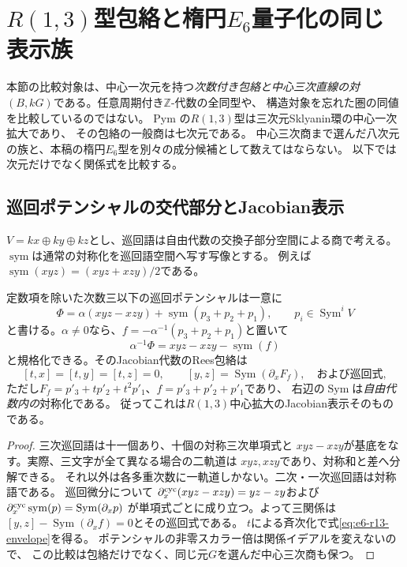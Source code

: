 \section{\texorpdfstring{$R(1,3)$型包絡と楕円$E_6$量子化の同じ表示族}{R(1,3)型包絡と楕円E6量子化の同じ表示族}}
\label{sec:e6-r13-comparison}
本節の比較対象は、中心一次元を持つ\emph{次数付き包絡と中心三次直線の対}
$(B,kG)$である。任意周期付き$\mathbb Z$-代数の全同型や、
構造対象を忘れた圏の同値を比較しているのではない。
Pym \cite[\S3.4, (9)]{PymR13}の$R(1,3)$型は三次元Sklyanin環の中心一次拡大であり、
その包絡の一般商は七次元である。
中心三次商まで選んだ八次元の族と、本稿の楕円$E_6$型を別々の成分候補として数えてはならない。
以下では次元だけでなく関係式を比較する。

\subsection{巡回ポテンシャルの交代部分とJacobian表示}
$V=kx\oplus ky\oplus kz$とし、巡回語は自由代数の交換子部分空間による商で考える。
$\operatorname{sym}$は通常の対称化を巡回語空間へ写す写像とする。
例えば$\operatorname{sym}(xyz)=(xyz+xzy)/2$である。
\begin{lemma}[交代係数が非零の巡回chart]
\label{lem:e6-r13-cyclic-chart}
定数項を除いた次数三以下の巡回ポテンシャルは一意に
\[
 \Phi=\alpha(xyz-xzy)+\operatorname{sym}(p_3+p_2+p_1),
 \qquad p_i\in\operatorname{Sym}^iV
\]
と書ける。$\alpha\ne0$なら、$f=-\alpha^{-1}(p_3+p_2+p_1)$と置いて
\[
 \alpha^{-1}\Phi=xyz-xzy-\operatorname{sym}(f)
\]
と規格化できる。そのJacobian代数のRees包絡は
\begin{equation}\label{eq:e6-r13-envelope}
 [t,x]=[t,y]=[t,z]=0,\qquad
 [y,z]=\operatorname{Sym}(\partial_xF_f),\quad\text{および巡回式},
\end{equation}
ただし$F_f=p'_3+t p'_2+t^2p'_1$、$f=p'_3+p'_2+p'_1$であり、
右辺の$\operatorname{Sym}$は\emph{自由代数内の}対称化である。
従ってこれは$R(1,3)$中心拡大のJacobian表示そのものである。
\end{lemma}
\begin{proof}
三次巡回語は十一個あり、十個の対称三次単項式と
$xyz-xzy$が基底をなす。実際、三文字が全て異なる場合の二軌道は
$xyz,xzy$であり、対称和と差へ分解できる。
それ以外は各多重次数に一軌道しかない。二次・一次巡回語は対称語である。
巡回微分について
$\partial_x^{\rm cyc}(xyz-xzy)=yz-zy$および
$\partial_x^{\rm cyc}\operatorname{sym}(p)=\operatorname{Sym}(\partial_xp)$
が単項式ごとに成り立つ。よって三関係は
$[y,z]-\operatorname{Sym}(\partial_xf)=0$とその巡回式である。
$t$による斉次化で式\eqref{eq:e6-r13-envelope}を得る。
ポテンシャルの非零スカラー倍は関係イデアルを変えないので、
この比較は包絡だけでなく、同じ元$G$を選んだ中心三次商も保つ。
\end{proof}

